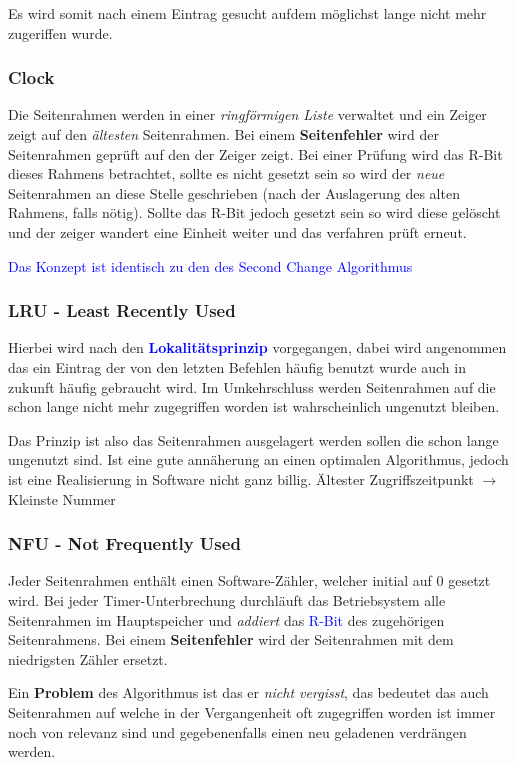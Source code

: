 \documentclass[10pt,a4paper]{article}
\begin{document}
\begin{multicols*}{4}
Es wird somit nach einem Eintrag gesucht aufdem möglichst lange nicht mehr zugeriffen wurde.

\subsubsection*{Clock}
Die Seitenrahmen werden in einer \textit{ringförmigen Liste} verwaltet und ein Zeiger zeigt auf den \textit{ältesten}
Seitenrahmen. Bei einem \textbf{Seitenfehler} wird der Seitenrahmen geprüft auf den der Zeiger zeigt. Bei einer Prüfung
wird das R-Bit dieses Rahmens betrachtet, sollte es nicht gesetzt sein so wird der \textit{neue} Seitenrahmen an diese
Stelle geschrieben (nach der Auslagerung des alten Rahmens, falls nötig). Sollte das R-Bit jedoch gesetzt sein so wird
diese gelöscht und der zeiger wandert eine Einheit weiter und das verfahren prüft erneut.

\textcolor{blue}{\small Das Konzept ist identisch zu den des Second Change Algorithmus}

\subsubsection*{LRU - Least Recently Used}
Hierbei wird nach den \textcolor{blue}{\bf Lokalitätsprinzip} vorgegangen, dabei wird angenommen das ein Eintrag der von
den letzten Befehlen häufig benutzt wurde auch in zukunft häufig gebraucht wird. Im Umkehrschluss werden Seitenrahmen
auf die schon lange nicht mehr zugegriffen worden ist wahrscheinlich ungenutzt bleiben.

Das Prinzip ist also das Seitenrahmen ausgelagert werden sollen die schon lange ungenutzt sind. Ist eine gute annäherung
an einen optimalen Algorithmus, jedoch ist eine Realisierung in Software nicht ganz billig. Ältester Zugriffszeitpunkt
\(\rightarrow\) Kleinste Nummer

\subsubsection*{NFU -  Not Frequently Used}
Jeder Seitenrahmen enthält einen Software-Zähler, welcher initial auf 0 gesetzt wird. Bei jeder Timer-Unterbrechung
durchläuft das Betriebsystem alle Seitenrahmen im Hauptspeicher und \textit{addiert} das \textcolor{blue}{R-Bit} des
zugehörigen Seitenrahmens. Bei einem \textbf{Seitenfehler} wird der Seitenrahmen mit dem niedrigsten Zähler ersetzt.

Ein \textbf{Problem} des Algorithmus ist das er \textit{nicht vergisst}, das bedeutet das auch Seitenrahmen auf welche
in der Vergangenheit oft zugegriffen worden ist immer noch von relevanz sind und gegebenenfalls einen neu geladenen
verdrängen werden.


\end{multicols*}
\end{document}
